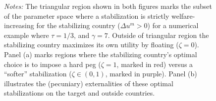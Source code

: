 \begin{figure}
\begin{minipage}{\linewidth}
\begin{centering}
\begin{subfigure}{.49\textwidth}
      \end{subfigure}

    \end{centering}

    \bigskip \small \textit{Notes:} The triangular region shown in
    both figures marks the subset of the parameter space where a
    stabilization is strictly welfare-increasing for the stabilizing
    country ($\Delta u^m>0 $) for a numerical example where
    \(\tau=1/3\), and \(\gamma=7\). Outside of triangular region the
    stabilizing country maximizes its own utility by floating
    ($\zeta=0 $). Panel (a) marks regions where the stabilizing
    country's optimal choice is to impose a hard peg ($\zeta=1 $,
    marked in red) versus a ``softer'' stabilization
    ($\zeta\in (0,1) $, marked in purple). Panel (b) illustrates the
    (pecuniary) externalities of these optimal stabilizations on the
    target and outside countries. \end{minipage}
\end{figure}

\clearpage
